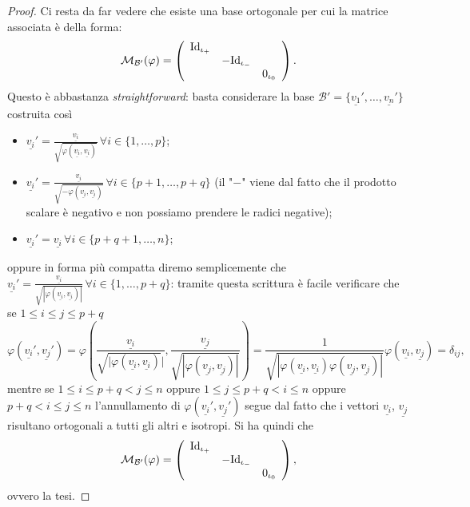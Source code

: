 \begin{proof}
	Ci resta da far vedere che esiste una base ortogonale per cui la matrice associata è della forma:
	\begin{align}
		\mathcal{M}_{\mathcal{B}'}(\varphi) = \left( \begin{array}{c c c} \text{Id}_{\iota_+} &  &  \\
		& -\text{Id}_{\iota_-} &  \\ 
		& & 0_{\iota_0}
		\end{array} \right).
	\end{align}
	Questo è abbastanza \emph{straightforward}: basta considerare la base $\mathcal{B}' = \{ \underline{v_1}', \ldots, \underline{v_n}' \}$ costruita così
	\begin{itemize}
		\item $\underline{v_i}' = \frac{\underline{v_i}}{\sqrt{\varphi(\underline{v_i}, \underline{v_i})}} \, \forall i \in \{ 1, \ldots, p \}$;
		\item $\underline{v_i}' = \frac{\underline{v_i}}{\sqrt{-\varphi(\underline{v_i}, \underline{v_i})}} \, \forall i \in \{ p+1, \ldots, p+q \}$ (il "$-$" viene dal fatto che il prodotto scalare è negativo e non possiamo prendere le radici negative);
		\item $\underline{v_i}' = \underline{v_i} \, \forall i \in \{ p + q + 1, \ldots, n \}$;
	\end{itemize}
	oppure in forma più compatta diremo semplicemente che $\underline{v_i}' = \frac{\underline{v_i}}{\sqrt{|\varphi(\underline{v_i}, \underline{v_i})|}} \, \forall i \in \{ 1, \ldots, p + q\}$: tramite questa scrittura è facile verificare che se $1 \leq i \leq j \leq p+q$
	$$
		\varphi(\underline{v_i}', \underline{v_j}') = \varphi(\frac{\underline{v_i}}{\sqrt{|\varphi(\underline{v_i},\underline{v_i})}|}, \frac{\underline{v_j}}{\sqrt{|\varphi(\underline{v_j}, \underline{v_j})|}}) = \frac{1}{\sqrt{|\varphi(\underline{v_i}, \underline{v_i}) \varphi(\underline{v_j}, \underline{v_j})|}} \varphi(\underline{v_i}, \underline{v_j}) = \delta_{ij},
	$$
	mentre se $1 \leq i \leq p+q < j \leq n$ oppure $1 \leq j \leq p+q < i \leq n$ oppure $p+q < i \leq j \leq n$ l'annullamento di $\varphi(\underline{v_i}', \underline{v_j}')$ segue dal fatto che i vettori $\underline{v_i}$, $\underline{v_j}$ risultano ortogonali a tutti gli altri e isotropi. Si ha quindi che
	\begin{align}
		\mathcal{M}_{\mathcal{B}'}(\varphi) = \left( \begin{array}{c c c} \text{Id}_{\iota_+} &  &  \\
		& -\text{Id}_{\iota_-} &  \\ 
		& & 0_{\iota_0}
		\end{array} \right),
	\end{align}
	ovvero la tesi.
\end{proof}

